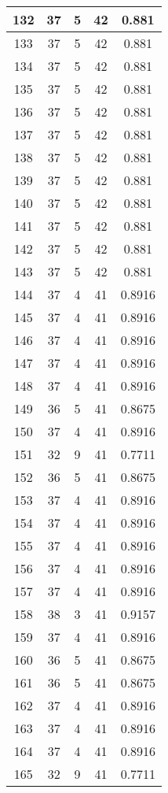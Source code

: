 \documentclass[letterpaper, 12pt]{article}
\begin{document}
\begin{longtable}{|c|c|c|c|c|}
\hline
132 & 37 & 5 & 42 & 0.881 \\
\hline
133 & 37 & 5 & 42 & 0.881 \\
\hline
134 & 37 & 5 & 42 & 0.881 \\
\hline
135 & 37 & 5 & 42 & 0.881 \\
\hline
136 & 37 & 5 & 42 & 0.881 \\
\hline
137 & 37 & 5 & 42 & 0.881 \\
\hline
138 & 37 & 5 & 42 & 0.881 \\
\hline
139 & 37 & 5 & 42 & 0.881 \\
\hline
140 & 37 & 5 & 42 & 0.881 \\
\hline
141 & 37 & 5 & 42 & 0.881 \\
\hline
142 & 37 & 5 & 42 & 0.881 \\
\hline
143 & 37 & 5 & 42 & 0.881 \\
\hline
144 & 37 & 4 & 41 & 0.8916 \\
\hline
145 & 37 & 4 & 41 & 0.8916 \\
\hline
146 & 37 & 4 & 41 & 0.8916 \\
\hline
147 & 37 & 4 & 41 & 0.8916 \\
\hline
148 & 37 & 4 & 41 & 0.8916 \\
\hline
149 & 36 & 5 & 41 & 0.8675 \\
\hline
150 & 37 & 4 & 41 & 0.8916 \\
\hline
151 & 32 & 9 & 41 & 0.7711 \\
\hline
152 & 36 & 5 & 41 & 0.8675 \\
\hline
153 & 37 & 4 & 41 & 0.8916 \\
\hline
154 & 37 & 4 & 41 & 0.8916 \\
\hline
155 & 37 & 4 & 41 & 0.8916 \\
\hline
156 & 37 & 4 & 41 & 0.8916 \\
\hline
157 & 37 & 4 & 41 & 0.8916 \\
\hline
158 & 38 & 3 & 41 & 0.9157 \\
\hline
159 & 37 & 4 & 41 & 0.8916 \\
\hline
160 & 36 & 5 & 41 & 0.8675 \\
\hline
161 & 36 & 5 & 41 & 0.8675 \\
\hline
162 & 37 & 4 & 41 & 0.8916 \\
\hline
163 & 37 & 4 & 41 & 0.8916 \\
\hline
164 & 37 & 4 & 41 & 0.8916 \\
\hline
165 & 32 & 9 & 41 & 0.7711 \\

\end{longtable}
\end{document}
